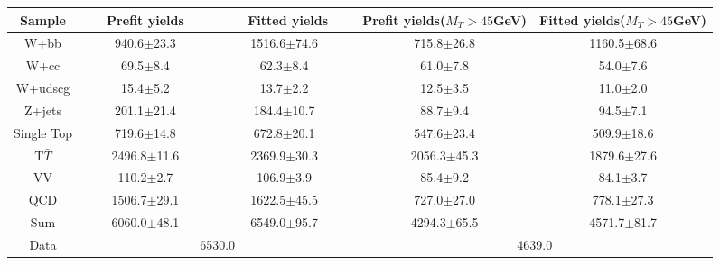 
 \begin{adjustbox}{width=\textwidth,center=\textwidth}
   \begin{tabular} {c|cc|cc} \hline\hline
			 Sample & ~~~Prefit yields~~~ & ~~~~Fitted yields~~~ & Prefit yields($M_T>45$GeV) & Fitted yields($M_T>45$GeV) \\ 
 \hline
W+bb&940.6$\pm$23.3&1516.6$\pm$74.6&715.8$\pm$26.8&1160.5$\pm$68.6\\
W+cc&69.5$\pm$8.4&62.3$\pm$8.4&61.0$\pm$7.8&54.0$\pm$7.6\\
W+udscg&15.4$\pm$5.2&13.7$\pm$2.2&12.5$\pm$3.5&11.0$\pm$2.0\\
Z+jets&201.1$\pm$21.4&184.4$\pm$10.7&88.7$\pm$9.4&94.5$\pm$7.1\\
Single Top&719.6$\pm$14.8&672.8$\pm$20.1&547.6$\pm$23.4&509.9$\pm$18.6\\
T$\bar{T}$&2496.8$\pm$11.6&2369.9$\pm$30.3&2056.3$\pm$45.3&1879.6$\pm$27.6\\
VV&110.2$\pm$2.7&106.9$\pm$3.9&85.4$\pm$9.2&84.1$\pm$3.7\\
QCD&1506.7$\pm$29.1&1622.5$\pm$45.5&727.0$\pm$27.0&778.1$\pm$27.3\\
\hline
Sum &6060.0$\pm$48.1&6549.0$\pm$95.7&4294.3$\pm$65.5&4571.7$\pm$81.7\\
\hline
Data&\multicolumn{2}{c}{6530.0}&\multicolumn{2}{c}{4639.0}\\
   \hline\hline
   \end{tabular}
 \end{adjustbox}

